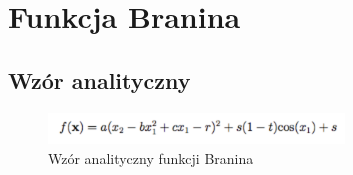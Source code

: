 \documentclass{article}
\begin{document}
                 
                 
                 
\section{Funkcja Branina}
\subsection{Wzór analityczny}
\begin{figure}[!htbp]
    \centering
    \includegraphics[width=0.7\textwidth]{inc/wzory/branin}
     \caption{Wzór analityczny funkcji Branina}
    \end{figure}                 
                 
\end{document}
